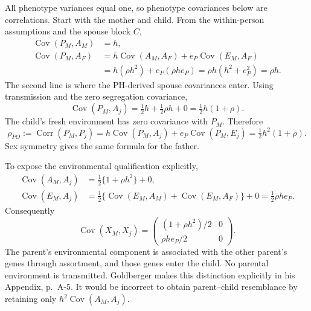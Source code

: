 All phenotype variances equal one, so phenotype covariances below
are correlations. Start with the mother and child. From the
within-person assumptions and the spouse block $C$,
\begin{align*}
 \operatorname{Cov}(P_M,A_M)&=h,\\
 \operatorname{Cov}(P_M,A_F)
 &=h\operatorname{Cov}(A_M,A_F)+e_P\operatorname{Cov}(E_M,A_F)\\
 &=h(\rho h^2)+e_P(\rho h e_P)
   =\rho h(h^2+e_P^2)=\rho h.
\end{align*}
The second line is where the PH-derived spouse covariances enter.
Using transmission and the zero segregation covariance,
\[
 \operatorname{Cov}(P_M,A_j)
 =\tfrac12 h+\tfrac12\rho h+0=\tfrac12h(1+\rho).
\]
The child's fresh environment has zero covariance with $P_M$. Therefore
\begin{equation}
 \rho_{PO}:=\operatorname{Corr}(P_M,P_j)
 =h\operatorname{Cov}(P_M,A_j)+e_P\operatorname{Cov}(P_M,E_j)
 =\boxed{\tfrac12h^2(1+\rho).}
 \label{eq:po}
\end{equation}
Sex symmetry gives the same formula for the father.

To expose the environmental qualification explicitly,
\begin{align*}
 \operatorname{Cov}(A_M,A_j)
 &=\tfrac12\{1+\rho h^2\}+0,\\
 \operatorname{Cov}(E_M,A_j)
 &=\tfrac12\{\operatorname{Cov}(E_M,A_M)
             +\operatorname{Cov}(E_M,A_F)\}+0
   =\tfrac12\rho h e_P.
\end{align*}
Consequently
\[
 \operatorname{Cov}(X_M,X_j)=
 \begin{pmatrix}(1+\rho h^2)/2&0\\\rho h e_P/2&0\end{pmatrix}.
\]
The parent's environmental component is associated with the other
parent's genes through assortment, and those genes enter the child.
No parental environment is transmitted. Goldberger makes this
distinction explicitly in his Appendix, p.~A-5. It would be incorrect
to obtain parent--child resemblance by retaining only
$h^2\operatorname{Cov}(A_M,A_j)$.

